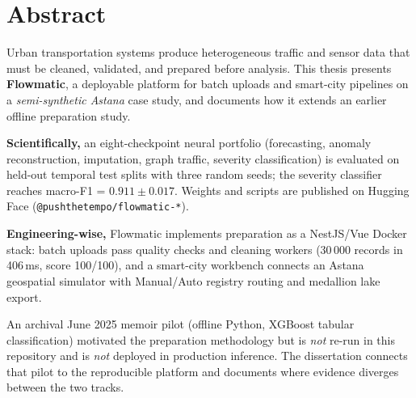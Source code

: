 %
%
\chapter{Abstract}
\begin{SingleSpace}
Urban transportation systems produce heterogeneous traffic and sensor data that must be cleaned, validated, and prepared before analysis. This thesis presents \textbf{Flowmatic}, a deployable platform for batch uploads and smart-city pipelines on a \emph{semi-synthetic Astana} case study, and documents how it extends an earlier offline preparation study.

\textbf{Scientifically,} an eight-checkpoint neural portfolio (forecasting, anomaly reconstruction, imputation, graph traffic, severity classification) is evaluated on held-out temporal test splits with three random seeds; the severity classifier reaches macro-F1 = $0.911 \pm 0.017$. Weights and scripts are published on Hugging Face (\texttt{@pushthetempo/flowmatic-*}).

\textbf{Engineering-wise,} Flowmatic implements preparation as a NestJS/Vue Docker stack: batch uploads pass quality checks and cleaning workers (30\,000 records in 406\,ms, score 100/100), and a smart-city workbench connects an Astana geospatial simulator with Manual/Auto registry routing and medallion lake export.

An archival June 2025 memoir pilot (offline Python, XGBoost tabular classification) motivated the preparation methodology but is \emph{not} re-run in this repository and is \emph{not} deployed in production inference. The dissertation connects that pilot to the reproducible platform and documents where evidence diverges between the two tracks.

\end{SingleSpace}
